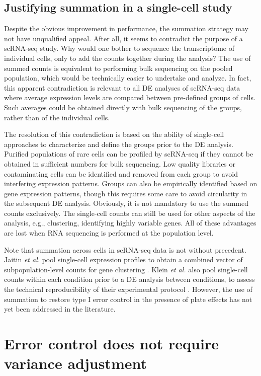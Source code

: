 \documentclass{article}
\begin{document}
\subsection{Justifying summation in a single-cell study}
Despite the obvious improvement in performance, the summation strategy may not have unqualified appeal.
After all, it seems to contradict the purpose of a scRNA-seq study. 
Why would one bother to sequence the transcriptome of individual cells, only to add the counts together during the analysis?
The use of summed counts is equivalent to performing bulk sequencing on the pooled population, which would be technically easier to undertake and analyze.
In fact, this apparent contradiction is relevant to all DE analyses of scRNA-seq data where average expression levels are compared between pre-defined groups of cells.
Such averages could be obtained directly with bulk sequencing of the groups, rather than of the individual cells.

The resolution of this contradiction is based on the ability of single-cell approaches to characterize and define the groups prior to the DE analysis.
Purified populations of rare cells can be profiled by scRNA-seq if they cannot be obtained in sufficient numbers for bulk sequencing.
Low quality libraries or contaminating cells can be identified and removed from each group to avoid interfering expression patterns.
Groups can also be empirically identified based on gene expression patterns, though this requires some care to avoid circularity in the subsequent DE analysis.
Obviously, it is not mandatory to use the summed counts exclusively. 
The single-cell counts can still be used for other aspects of the analysis, e.g., clustering, identifying highly variable genes.
All of these advantages are lost when RNA sequencing is performed at the population level.

Note that summation across cells in scRNA-seq data is not without precedent.
Jaitin \textit{et al.} pool single-cell expression profiles to obtain a combined vector of subpopulation-level counts for gene clustering \cite{jaitin2014massively}.
Klein \textit{et al.} also pool single-cell counts within each condition prior to a DE analysis between conditions,
    to assess the technical reproducibility of their experimental protocol \cite{klein2015droplet}.
However, the use of summation to restore type I error control in the presence of plate effects has not yet been addressed in the literature.

\section{Error control does not require variance adjustment}
\end{document}
